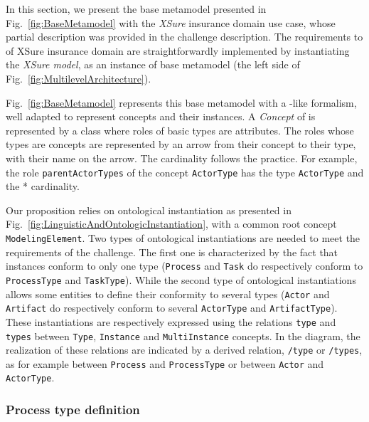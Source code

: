 In this section, we present the base metamodel presented in
Fig.~\ref{fig:BaseMetamodel} with the \textit{XSure} insurance domain use case,
whose partial description was provided in the challenge description. The
requirements  to  of XSure insurance domain are
straightforwardly implemented by instantiating the \emph{XSure model}, as an
instance of base metamodel (the left side of
Fig.~\ref{fig:MultilevelArchitecture}).

Fig.~\ref{fig:BaseMetamodel} represents this base metamodel with a \UML-like
formalism, well adapted to represent \FML concepts and their instances. A
\textit{Concept} of \FML is represented by a \UML class where roles of basic
types are attributes. The roles whose types are concepts are represented by an
arrow from their concept to their type, with their name on the arrow. The
cardinality follows the \UML practice.  For example, the role
\texttt{parentActorTypes} of the concept \texttt{ActorType} has the type
\texttt{ActorType} and the * cardinality.

Our proposition relies on ontological instantiation as presented in
Fig.~\ref{fig:LinguisticAndOntologicInstantiation}, with a common root concept
\texttt{ModelingElement}. Two types of ontological instantiations are needed to
meet the requirements of the challenge. 
The first one is characterized by the fact that instances conform to only one
type (\texttt{Process} and \texttt{Task} do respectively conform to
\texttt{ProcessType} and \texttt{TaskType}). While the second type of
ontological instantiations allows some entities to define their conformity to
several types (\texttt{Actor} and \texttt{Artifact} do respectively conform to
several \texttt{ActorType} and \texttt{ArtifactType}). 
These instantiations are respectively expressed using
the relations \texttt{type} and \texttt{types} between \texttt{Type},
\texttt{Instance} and \texttt{MultiInstance} concepts. In the diagram, the
realization of these relations are indicated by a derived relation,
\texttt{/type} or \texttt{/types}, as for example between \texttt{Process} and
\texttt{ProcessType} or between \texttt{Actor} and \texttt{ActorType}.

\subsubsection{Process type definition}

